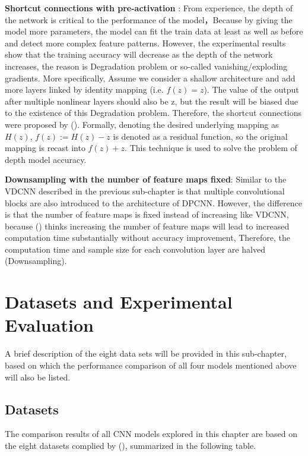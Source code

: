 \documentclass[]{krantz}
\begin{document}
\textbf{Shortcut connections with pre-activation} : From experience, the depth of the network is critical to the performance of the model，Because by giving the model more parameters, the model can fit the train data at least as well as before and detect more complex feature patterns. However, the experimental results show that the training accuracy will decrease as the depth of the network increases, the reason is Degradation problem or so-called vanishing/exploding gradients. More specifically, Assume we consider a shallow architecture and add more layers linked by identity mapping (i.e. \(f(z) = z\)). The value of the output after multiple nonlinear layers should also be z, but the result will be biased due to the existence of this Degradation problem. Therefore, the shortcut connections were proposed by (\citet{He2016DeepRL}). Formally, denoting the desired underlying mapping as \(H(z)\), \(f(z) := H(z)−z\) is denoted as a residual function, so the original mapping is recast into \(f(z)+z\). This technique is used to solve the problem of depth model accuracy.

\textbf{Downsampling with the number of feature maps fixed}: Similar to the VDCNN described in the previous sub-chapter is that multiple convolutional blocks are also introduced to the architecture of DPCNN. However, the difference is that the number of feature maps is fixed instead of increasing like VDCNN, because (\citet{Johnson2017DeepPC}) thinks increasing the number of feature maps will lead to increased computation time substantially without accuracy improvement, Therefore, the computation time and sample size for each convolution layer are halved (Downsampling).

\hypertarget{datasets-and-experimental-evaluation}{%
\section{Datasets and Experimental Evaluation}\label{datasets-and-experimental-evaluation}}

A brief description of the eight data sets will be provided in this sub-chapter, based on which the performance comparison of all four models mentioned above will also be listed.

\hypertarget{datasets}{%
\subsection{Datasets}\label{datasets}}

The comparison results of all CNN models explored in this chapter are based on the eight datasets complied by (\citet{Zhang2015CharacterlevelCN}), summarized in the following table.
\end{document}
